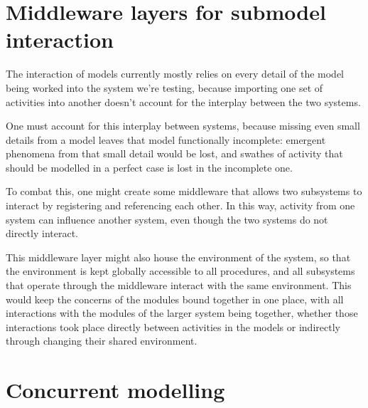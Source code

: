 \section{Middleware layers for submodel interaction}
\label{middleware-layers}
The interaction of models currently mostly relies on every detail of the model being worked into the system we're testing, because importing one set of activities into another doesn't account for the interplay between the two systems. \par
One must account for this interplay between systems, because missing even small details from a model leaves that model functionally incomplete: emergent phenomena from that small detail would be lost, and swathes of activity that should be modelled in a perfect case is lost in the incomplete one. \par
To combat this, one might create some middleware that allows two subsystems to interact by registering and referencing each other. In this way, activity from one system can influence another system, even though the two systems do not directly interact. \par
This middleware layer might also house the environment of the system, so that the environment is kept globally accessible to all procedures, and all subsystems that operate through the middleware interact with the same environment. This would keep the concerns of the modules bound together in one place, with all interactions with the modules of the larger system being together, whether those interactions took place directly between activities in the models or indirectly through changing their shared environment.

\section{Concurrent modelling}
\label{concurrent_modelling}



\section{}